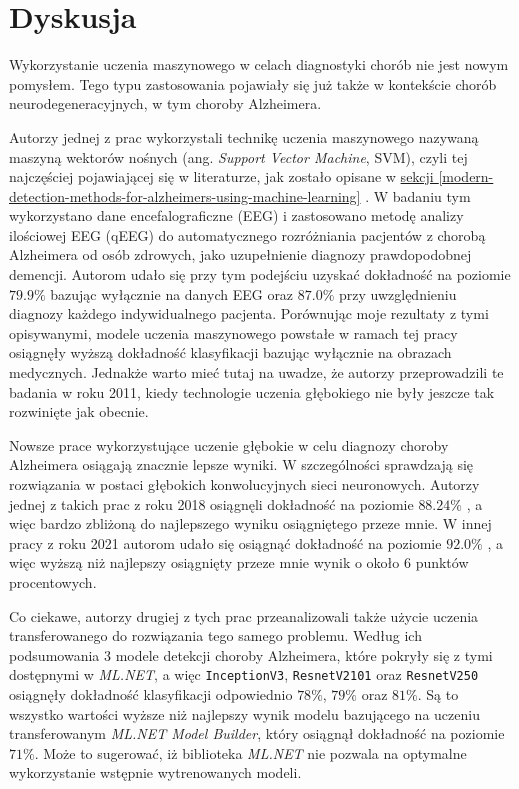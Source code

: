 \chapter{Dyskusja}

Wykorzystanie uczenia maszynowego w celach diagnostyki chorób nie jest nowym pomysłem.
Tego typu zastosowania pojawiały się już także w kontekście chorób neurodegeneracyjnych, w tym choroby Alzheimera.

Autorzy jednej z prac wykorzystali technikę uczenia maszynowego nazywaną maszyną wektorów nośnych (ang. \emph{Support Vector Machine}, SVM), czyli tej najczęściej pojawiającej się w literaturze, jak zostało opisane w \hyperref[modern-detection-methods-for-alzheimers-using-machine-learning]{sekcji \ref*{modern-detection-methods-for-alzheimers-using-machine-learning}} \cite{trambaiolli2011improving}.
W badaniu tym wykorzystano dane encefalograficzne (EEG) i zastosowano metodę analizy ilościowej EEG (qEEG) do automatycznego rozróżniania pacjentów z chorobą Alzheimera od osób zdrowych, jako uzupełnienie diagnozy prawdopodobnej demencji.
Autorom udało się przy tym podejściu uzyskać dokładność na poziomie $79.9\%$ bazując wyłącznie na danych EEG oraz $87.0\%$ przy uwzględnieniu diagnozy każdego indywidualnego pacjenta.
Porównując moje rezultaty z tymi opisywanymi, modele uczenia maszynowego powstałe w ramach tej pracy osiągnęły wyższą dokładność klasyfikacji bazując wyłącznie na obrazach medycznych.
Jednakże warto mieć tutaj na uwadze, że autorzy przeprowadzili te badania w roku 2011, kiedy technologie uczenia głębokiego nie były jeszcze tak rozwinięte jak obecnie.

Nowsze prace wykorzystujące uczenie głębokie w celu diagnozy choroby Alzheimera osiągają znacznie lepsze wyniki.
W szczególności sprawdzają się rozwiązania w postaci głębokich konwolucyjnych sieci neuronowych.
Autorzy jednej z takich prac z roku 2018 osiągnęli dokładność na poziomie $88.24\%$ \cite{shahbaz2019classification}, a więc bardzo zbliżoną do najlepszego wyniku osiągniętego przeze mnie.
W innej pracy z roku 2021 autorom udało się osiągnąć dokładność na poziomie $92.0\%$ \cite{ebrahimi2021deep}, a więc wyższą niż najlepszy osiągnięty przeze mnie wynik o około 6 punktów procentowych.

Co ciekawe, autorzy drugiej z tych prac przeanalizowali także użycie uczenia transferowanego do rozwiązania tego samego problemu.
Według ich podsumowania 3 modele detekcji choroby Alzheimera, które pokryły się z tymi dostępnymi w \emph{ML.NET}, a więc \lstinline{InceptionV3}, \lstinline{ResnetV2101} oraz \lstinline{ResnetV250} osiągnęły dokładność klasyfikacji odpowiednio $78\%$, $79\%$ oraz $81\%$.
Są to wszystko wartości wyższe niż najlepszy wynik modelu bazującego na uczeniu transferowanym \emph{ML.NET Model Builder}, który osiągnął dokładność na poziomie $71\%$.
Może to sugerować, iż biblioteka \emph{ML.NET} nie pozwala na optymalne wykorzystanie wstępnie wytrenowanych modeli.

